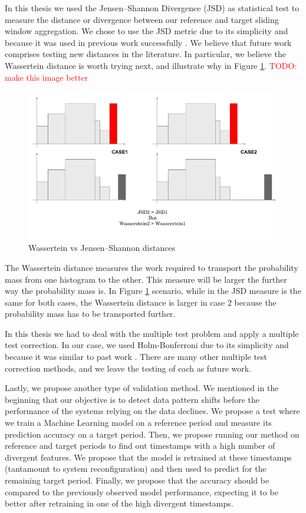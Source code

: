 In this thesis we used the Jensen–Shannon Divergence (JSD) as statistical test to measure the distance or divergence between our reference and target sliding window aggregation. We chose to use the JSD metric due to its simplicity and because it was used in previous work successfully \cite{SAMM}. We believe that future work comprises testing new distances in the literature. In particular, we believe the Wassertein distance is worth trying next, and illustrate why in Figure \ref{fig:wasserteinvsjsd}.
\textcolor{red}{TODO: make this image better}
\begin{figure}[!htb]
    \begin{center}
      \includegraphics[scale=0.6]{figures/wasserstein-vs-jsd.pdf}
      \caption{Wassertein vs Jensen–Shannon distances}
      \label{fig:wasserteinvsjsd}
    \end{center}
\end{figure}
The Wassertein distance measures the work required to transport the probability mass from one histogram to the other. This measure will be larger the further way the probability mass is. In Figure \ref{fig:wasserteinvsjsd} scenario, while in the JSD measure is the same for both cases, the Wassertein distance is larger in case 2 because the probability mass has to be transported further.

In this thesis we had to deal with the multiple test problem and apply a multiple test correction. In our case, we used Holm-Bonferroni due to its simplicity and because it was similar to past work \cite{SAMM}. There are many other multiple test correction methods, and we leave the testing of each as future work.

Lastly, we propose another type of validation method. We mentioned in the beginning that our objective is to detect data pattern shifts before the performance of the systems relying on the data declines. We propose a test where we train a Machine Learning model on a reference period and measure its prediction accuracy on a target period. Then, we propose running our method on reference and target periods to find out timestamps with a high number of divergent features. We propose that the model is retrained at these timestamps (tantamount to system reconfiguration) and then used to predict for the remaining target period. Finally, we propose that the accuracy should be compared to the previously observed model performance, expecting it to be better after retraining in one of the high divergent timestamps.
